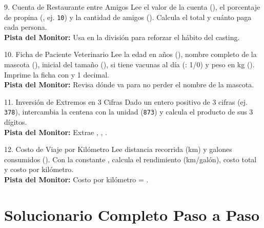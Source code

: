 \documentclass[11pt,letterpaper]{article}
\begin{document}
\begin{ejercicio}{9. Cuenta de Restaurante entre Amigos}
Lee el valor de la cuenta (), el porcentaje de propina (, ej. \texttt{10}) y la cantidad de amigos (). Calcula el total y cuánto paga cada persona.\\
\textbf{Pista del Monitor:} Usa  en la división para reforzar el hábito del casting.
\end{ejercicio}

\begin{ejercicio}{10. Ficha de Paciente Veterinario}
Lee la edad en años (), nombre completo de la mascota (), inicial del tamaño (), si tiene vacunas al día (: 1/0) y peso en kg (). Imprime la ficha con  y 1 decimal.\\
\textbf{Pista del Monitor:} Revisa dónde va  para no perder el nombre de la mascota.
\end{ejercicio}

\begin{ejercicio}{11. Inversión de Extremos en 3 Cifras}
Dado un entero positivo de 3 cifras (ej. \texttt{378}), intercambia la centena con la unidad (\texttt{873}) y calcula el producto de sus 3 dígitos.\\
\textbf{Pista del Monitor:} Extrae , , .
\end{ejercicio}

\begin{ejercicio}{12. Costo de Viaje por Kilómetro}
Lee distancia recorrida (km) y galones consumidos (). Con la constante , calcula el rendimiento (km/galón), costo total y costo por kilómetro.\\
\textbf{Pista del Monitor:} Costo por kilómetro = .
\end{ejercicio}

\section{Solucionario Completo Paso a Paso}
\end{document}
